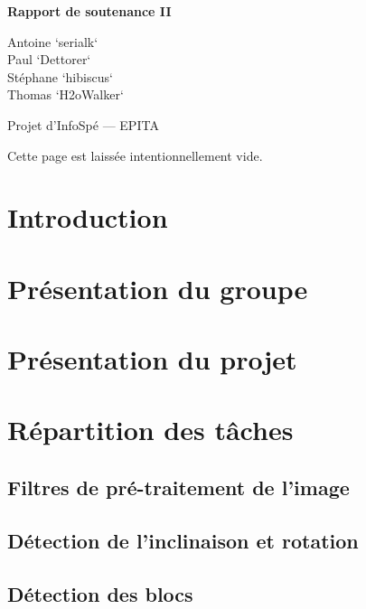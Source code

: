 \documentclass[12pt,a4paper]{article}
\newcommand{\subtitle}{Rapport de soutenance II}
\begin{document}
\begin{titlepage}
\begin{center}
\vspace{8cm}
\vspace{0.5cm}

\LARGE{\textbf{\subtitle}}
\vspace{1cm}

\large{\textsf{
Antoine `serialk`  \\
Paul `Dettorer`  \\
Stéphane `hibiscus`  \\
Thomas `H2oWalker` }}
\vspace{2cm}

\large{\textsf{Projet d'InfoSpé --- EPITA}}
\end{center}
\end{titlepage}

\newpage
Cette page est laissée intentionnellement vide.

\newpage
\setcounter{tocdepth}{3}
\tableofcontents

\newpage
\pagestyle{headings}
\section{Introduction}

\section{Présentation du groupe}


\newpage
\section{Présentation du projet}


\newpage
\section{Répartition des tâches}
\subsection{Filtres de pré-traitement de l'image}

\newpage
\subsection{Détection de l'inclinaison et rotation}

\newpage
\subsection{Détection des blocs}

\newpage
\end{document}
